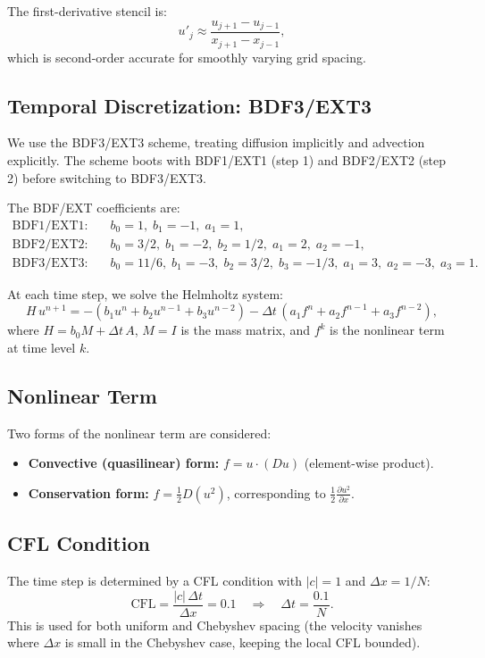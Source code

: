 \documentclass[11pt]{article}
\begin{document}
The first-derivative stencil is:
\[
u'_j \approx \frac{u_{j+1} - u_{j-1}}{x_{j+1} - x_{j-1}},
\]
which is second-order accurate for smoothly varying grid spacing.

\subsection{Temporal Discretization: BDF3/EXT3}

We use the BDF3/EXT3 scheme, treating diffusion implicitly and advection explicitly. The scheme boots with BDF1/EXT1 (step 1) and BDF2/EXT2 (step 2) before switching to BDF3/EXT3.

The BDF/EXT coefficients are:
\begin{align*}
\text{BDF1/EXT1:} &\quad b_0 = 1,\; b_1 = -1,\; a_1 = 1, \\
\text{BDF2/EXT2:} &\quad b_0 = 3/2,\; b_1 = -2,\; b_2 = 1/2,\; a_1 = 2,\; a_2 = -1, \\
\text{BDF3/EXT3:} &\quad b_0 = 11/6,\; b_1 = -3,\; b_2 = 3/2,\; b_3 = -1/3,\; a_1 = 3,\; a_2 = -3,\; a_3 = 1.
\end{align*}

At each time step, we solve the Helmholtz system:
\[
H\, u^{n+1} = -(b_1 u^n + b_2 u^{n-1} + b_3 u^{n-2}) - \Delta t\,(a_1 f^n + a_2 f^{n-1} + a_3 f^{n-2}),
\]
where $H = b_0 M + \Delta t\, A$, $M = I$ is the mass matrix, and $f^k$ is the nonlinear term at time level $k$.

\subsection{Nonlinear Term}

Two forms of the nonlinear term are considered:
\begin{itemize}
\item \textbf{Convective (quasilinear) form:} $f = u \cdot (Du)$ (element-wise product).
\item \textbf{Conservation form:} $f = \frac{1}{2} D(u^2)$, corresponding to $\frac{1}{2}\frac{\partial u^2}{\partial x}$.
\end{itemize}

\subsection{CFL Condition}

The time step is determined by a CFL condition with $|c| = 1$ and $\Delta x = 1/N$:
\[
\text{CFL} = \frac{|c|\,\Delta t}{\Delta x} = 0.1 \quad \Rightarrow \quad \Delta t = \frac{0.1}{N}.
\]
This is used for both uniform and Chebyshev spacing (the velocity vanishes where $\Delta x$ is small in the Chebyshev case, keeping the local CFL bounded).
\end{document}

